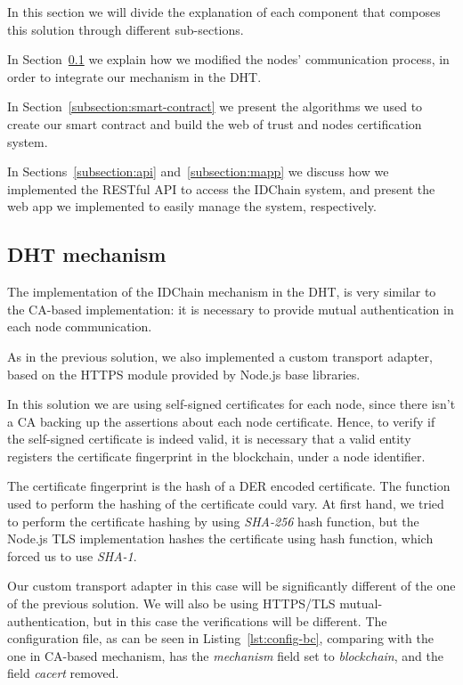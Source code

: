 In this section we will divide the explanation of each component that composes this solution through different sub-sections.

In Section~\ref{subsection:dht-mechanism} we explain how we modified the nodes' communication process, in order to integrate our mechanism in the DHT.

In Section~\ref{subsection:smart-contract} we present the algorithms we used to create our smart contract and build the web of trust and nodes certification system.

In Sections~\ref{subsection:api} and~\ref{subsection:mapp} we discuss how we implemented the RESTful API to access the IDChain system, and present the web app we implemented to easily manage the system, respectively.

\subsection{DHT mechanism}\label{subsection:dht-mechanism}

The implementation of the IDChain mechanism in the DHT, is very similar to the CA-based implementation: it is necessary to provide mutual authentication in each node communication.

As in the previous solution, we also implemented a custom transport adapter, based on the HTTPS module provided by Node.js base libraries.

In this solution we are using self-signed certificates for each node, since there isn't a CA backing up the assertions about each node certificate.
Hence, to verify if the self-signed certificate is indeed valid, it is necessary that a valid entity registers the certificate fingerprint in the blockchain, under a node identifier.

The certificate fingerprint is the hash of a \ac{DER} encoded certificate. The function used to perform the hashing of the certificate could vary.
At first hand, we tried to perform the certificate hashing by using \textit{SHA-256} hash function, but the Node.js TLS implementation hashes the certificate using  hash function, which forced us to use \textit{SHA-1}.

Our custom transport adapter in this case will be significantly different of the one of the previous solution.
We will also be using HTTPS/TLS mutual-authentication, but in this case the verifications will be different.
The configuration file, as can be seen in Listing~\ref{lst:config-bc}, comparing with the one in CA-based mechanism, has the \textit{mechanism} field set to \textit{blockchain}, and the field \textit{cacert} removed.

